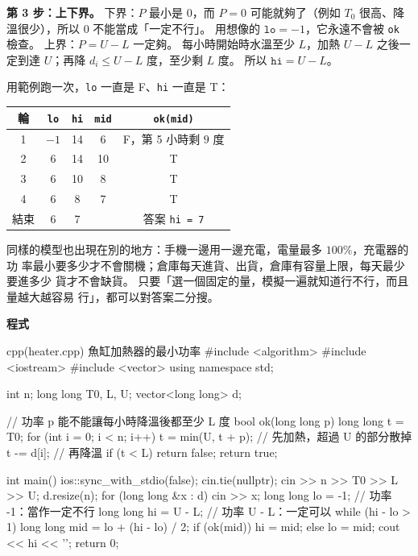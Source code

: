 \textbf{第 3 步：上下界。} 下界：$P$ 最小是 $0$，而 $P = 0$ 可能就夠了（例如
$T_0$ 很高、降溫很少），所以 $0$ 不能當成「一定不行」。 用想像的
$\texttt{lo} = -1$，它永遠不會被 \texttt{ok} 檢查。 上界：$P = U - L$ 一定夠。
每小時開始時水溫至少 $L$，加熱 $U - L$ 之後一定到達 $U$；再降 $d_i \le U - L$
度，至少剩 $L$ 度。 所以 $\texttt{hi} = U - L$。

用範例跑一次，\texttt{lo} 一直是 F、\texttt{hi} 一直是 T：

\begin{center}
\begin{tabular}{ccccc}
\toprule
輪 & \texttt{lo} & \texttt{hi} & \texttt{mid} & \texttt{ok(mid)} \\
\midrule
1 & $-1$ & 14 & 6 & F，第 5 小時剩 $9$ 度 \\
2 & 6 & 14 & 10 & T \\
3 & 6 & 10 & 8 & T \\
4 & 6 & 8 & 7 & T \\
\midrule
結束 & 6 & 7 & & 答案 \texttt{hi = 7} \\
\bottomrule
\end{tabular}
\end{center}

同樣的模型也出現在別的地方：手機一邊用一邊充電，電量最多 $100\%$，充電器的功
率最小要多少才不會關機；倉庫每天進貨、出貨，倉庫有容量上限，每天最少要進多少
貨才不會缺貨。 只要「選一個固定的量，模擬一遍就知道行不行，而且量越大越容易
行」，都可以對答案二分搜。

\textbf{程式}

\begin{example}[label=ex:heater]{cpp}{(heater.cpp) 魚缸加熱器的最小功率}
#include <algorithm>
#include <iostream>
#include <vector>
using namespace std;

int n;
long long T0, L, U;
vector<long long> d;

// 功率 p 能不能讓每小時降溫後都至少 L 度
bool ok(long long p) {
    long long t = T0;
    for (int i = 0; i < n; i++) {
        t = min(U, t + p);      // 先加熱，超過 U 的部分散掉
        t -= d[i];              // 再降溫
        if (t < L) {
            return false;
        }
    }
    return true;
}

int main() {
    ios::sync_with_stdio(false);
    cin.tie(nullptr);
    cin >> n >> T0 >> L >> U;
    d.resize(n);
    for (long long &x : d) {
        cin >> x;
    }
    long long lo = -1;          // 功率 -1：當作一定不行
    long long hi = U - L;       // 功率 U - L：一定可以
    while (hi - lo > 1) {
        long long mid = lo + (hi - lo) / 2;
        if (ok(mid)) {
            hi = mid;
        } else {
            lo = mid;
        }
    }
    cout << hi << '\n';
    return 0;
}
\end{example}

